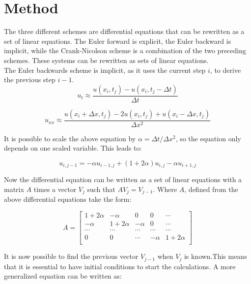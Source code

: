 \documentclass[10pt,a4paper]{article}
\begin{document}
\newpage
\section*{Method}

\noindent The three different schemes are differential equations that can be rewritten as a set of linear equations. The Euler forward is explicit, the Euler backward is implicit, while the Crank-Nicolson scheme is a combination of the two preceding schemes. These systems can be rewritten as sets of linear equations. \\


\noindent The Euler backwards scheme is implicit, as it uses the current step $i$, to derive the previous step $i-1$. 
\\
\begin{equation}
u_t \approx \frac{u(x_i,t_j) - u(x_i,t_j - \Delta t)}{\Delta t}
\end{equation}

\begin{equation}
u_{xx} \approx \frac{u(x_i + \Delta x,t_j) - 2u(x_i,t_j) + u(x_i - \Delta x,t_j)}{\Delta x^2}
\end{equation}

\noindent It is possible to scale the above equation by $\alpha = \Delta t / \Delta x^2$, so the equation only depends on one scaled variable. This leads to:

\begin{equation}
u_{i,j-1} = -\alpha u_{i-1,j} + (1 + 2\alpha)u_{i,j} - \alpha u_{i+1,j}
\end{equation}

\noindent Now the differential equation can be written as a set of linear equations with a matrix $A$ times a vector $V_j$ such that $AV_j = V_{j-1}$. Where $A$, defined from the above differential equations take the form:

\begin{equation}
A = \begin{bmatrix}
1 + 2\alpha & -\alpha & 0 & 0 &\cdots\\
-\alpha & 1 + 2\alpha & -\alpha & 0 & \cdots\\
\cdots & \cdots & \cdots & \cdots & \cdots\\
0 & 0 & \cdots & -\alpha & 1 + 2\alpha\\

\end{bmatrix}
\end{equation}

\noindent It is now possible to find the previous vector $V_{j-1}$ when $V_j$ is known.This means that it is essential to have initial conditions to start the calculations. A more generalized equation can be written as:
\end{document}
